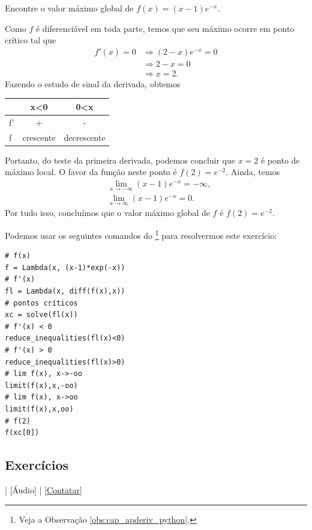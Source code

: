 \begin{exeresol}
  Encontre o valor máximo global de $f(x) = (x-1)e^{-x}$.
\end{exeresol}
\begin{resol}
  Como $f$ é diferenciável em toda parte, temos que seu máximo ocorre em ponto crítico tal que
  \begin{align}
    f'(x) = 0 &\Rightarrow (2-x)e^{-x} = 0 \\
              &\Rightarrow 2-x = 0 \\
              &\Rightarrow x = 2.
  \end{align}
  Fazendo o estudo de sinal da derivada, obtemos
  \begin{center}
    \begin{tabular}[H]{lcc}
         & x<0 & 0<x \\\hline
      f' & + & - \\
      f  & crescente & decrescente \\\hline
    \end{tabular}
  \end{center}
  Portanto, do teste da primeira derivada, podemos concluir que $x=2$ é ponto de máximo local. O favor da função neste ponto é $f(2) = e^{-2}$. Ainda, temos
  \begin{align}
    &\lim_{x\to -\infty} (x-1)e^{-x} = -\infty, \\
    &\lim_{x\to \infty} (x-1)e^{-x} = 0.
  \end{align}
  Por tudo isso, concluímos que o valor máximo global de $f$ é $f(2) = e^{-2}$.

  \ifispython
  Podemos usar os seguintes comandos do \sympy\footnote{Veja a Observação \ref{obs:cap_apderiv_python}.} para resolvermos este exercício:
\begin{verbatim}
# f(x)
f = Lambda(x, (x-1)*exp(-x))
# f'(x)
fl = Lambda(x, diff(f(x),x))
# pontos críticos
xc = solve(fl(x))
# f'(x) < 0
reduce_inequalities(fl(x)<0)
# f'(x) > 0
reduce_inequalities(fl(x)>0)
# lim f(x), x->-oo
limit(f(x),x,-oo)
# lim f(x), x->oo
limit(f(x),x,oo)
# f(2)
f(xc[0])
\end{verbatim}
  \fi
\end{resol}

\subsection*{Exercícios}

\begin{flushright}
  [Vídeo] | [Áudio] | \href{https://phkonzen.github.io/notas/contato.html}{[Contatar]}
\end{flushright}

